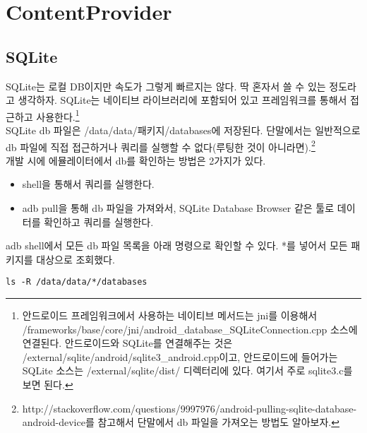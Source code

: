 \chapter{ContentProvider}
\section{SQLite}\label{sec:sqlite}
SQLite는 로컬 DB이지만 속도가 그렇게 빠르지는 않다. 딱 혼자서 쓸 수 있는 정도라고 생각하자.
SQLite는 네이티브 라이브러리에 포함되어 있고 프레임워크를 통해서 접근하고 사용한다.\footnote{안드로이드 프레임워크에서 사용하는 네이티브 메서드는 jni를 이용해서 /frameworks/base/core/jni/android\_database\_SQLiteConnection.cpp 소스에 연결된다.
안드로이드와 SQLite를 연결해주는 것은 /external/sqlite/android/sqlite3\_android.cpp이고,
안드로이드에 들어가는 SQLite 소스는 /external/sqlite/dist/ 디렉터리에 있다. 여기서 주로 sqlite3.c를 보면 된다.}\\

SQLite db 파일은 /data/data/패키지/databases에 저장된다. 
단말에서는 일반적으로 db 파일에 직접 접근하거나 쿼리를 실행할 수 없다(루팅한 것이 아니라면).\footnote{http://stackoverflow.com/questions/9997976/android-pulling-sqlite-database-android-device를 참고해서 단말에서 db 파일을 가져오는 방법도 알아보자.}\\

개발 시에 에뮬레이터에서 db를 확인하는 방법은 2가지가 있다.
\begin{itemize}
\item shell을 통해서 쿼리를 실행한다.
\item adb pull을 통해 db 파일을 가져와서, SQLite Database Browser 같은 툴로 데이터를 확인하고 쿼리를 실행한다.
\end{itemize}

adb shell에서 모든 db 파일 목록을 아래 명령으로 확인할 수 있다. *를 넣어서 모든 패키지를 대상으로 조회했다. 
\begin{lstlisting}[frame=single]
 ls -R /data/data/*/databases 
\end{lstlisting}

